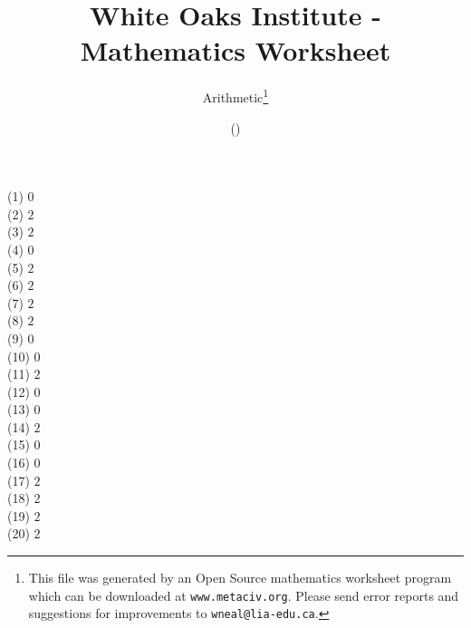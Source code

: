 \documentclass[letter]{article}
\begin{document}
\title{White Oaks Institute - Mathematics Worksheet}
\author{Arithmetic\thanks{This file was generated by an \textsf{Open Source} mathematics worksheet program which can be downloaded at \texttt{www.metaciv.org}. Please send error reports and suggestions for improvements to \texttt{wneal@lia-edu.ca}.}}
\date{\XCfileversion{} (\XCfiledate)}
\maketitle
\begin{multicols}{2}(1) $0$\\(2) $2$\\(3) $2$\\(4) $0$\\(5) $2$\\(6) $2$\\(7) $2$\\(8) $2$\\(9) $0$\\(10) $0$\\(11) $2$\\(12) $0$\\(13) $0$\\(14) $2$\\(15) $0$\\(16) $0$\\(17) $2$\\(18) $2$\\(19) $2$\\(20) $2$\end{multicols}
\end{document}
